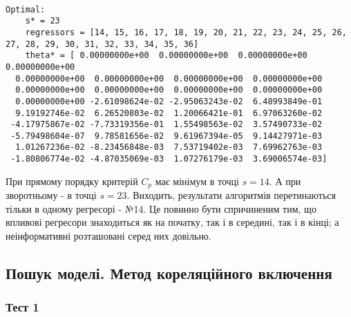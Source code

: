 \documentclass[11pt]{article}
\begin{document}
    \begin{center}
    \end{center}
    { \hspace*{\fill} \\}
    
    \begin{Verbatim}[commandchars=\\\{\}]
Optimal:
	s* = 23
	regressors = [14, 15, 16, 17, 18, 19, 20, 21, 22, 23, 24, 25, 26, 27, 28, 29, 30, 31, 32, 33, 34, 35, 36]
	theta* = [ 0.00000000e+00  0.00000000e+00  0.00000000e+00  0.00000000e+00
  0.00000000e+00  0.00000000e+00  0.00000000e+00  0.00000000e+00
  0.00000000e+00  0.00000000e+00  0.00000000e+00  0.00000000e+00
  0.00000000e+00 -2.61098624e-02 -2.95063243e-02  6.48993849e-01
  9.19192746e-02  6.26520803e-02  1.20066421e-01  6.97063260e-02
 -4.17975867e-02 -7.73319356e-01  1.55498563e-02  3.57490733e-02
 -5.79498604e-07  9.78581656e-02  9.61967394e-05  9.14427971e-03
  1.01267236e-02 -8.23456848e-03  7.53719402e-03  7.69962763e-03
 -1.80806774e-02 -4.87035069e-03  1.07276179e-03  3.69006574e-03]

    \end{Verbatim}

    При прямому порядку критерій \(C_p\) має мінімум в точці \(s=14\). А при
зворотньому - в точці \(s=23\). Виходить, результати алгоритмів
перетинаються тільки в одному регресорі - №14. Це повинно бути
спричиненим тим, що впливові регресори знаходиться як на початку, так і
в середині, так і в кінці; а неінформативні розташовані серед них
довільно.

    \subsection{Пошук моделі. Метод кореляційного
включення}\label{ux43fux43eux448ux443ux43a-ux43cux43eux434ux435ux43bux456.-ux43cux435ux442ux43eux434-ux43aux43eux440ux435ux43bux44fux446ux456ux439ux43dux43eux433ux43e-ux432ux43aux43bux44eux447ux435ux43dux43dux44f}

    \subsubsection{Тест 1}\label{ux442ux435ux441ux442-1}
\end{document}
